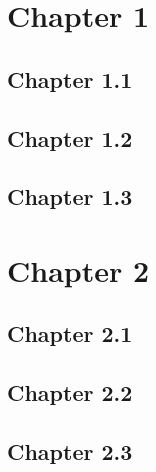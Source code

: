 \documentclass[12pt]{article}
\begin{document}
\section{Chapter 1}
\subsection{Chapter 1.1}
\subsection{Chapter 1.2}
\subsection{Chapter 1.3}
\newpage

\section{Chapter 2}
\subsection{Chapter 2.1}
\subsection{Chapter 2.2}
\subsection{Chapter 2.3}
\newpage
\end{document}
